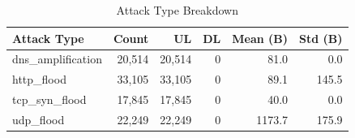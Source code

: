 \begin{table}[htbp]
\centering
\caption{Attack Type Breakdown}\label{tab:attack_types}
\begin{tabular}{lrrrrr}
\toprule
\textbf{Attack Type} & \textbf{Count} & \textbf{UL} & \textbf{DL} & \textbf{Mean (B)} & \textbf{Std (B)} \\
\midrule
dns\_amplification & 20,514 & 20,514 & 0 & 81.0 & 0.0 \\
http\_flood & 33,105 & 33,105 & 0 & 89.1 & 145.5 \\
tcp\_syn\_flood & 17,845 & 17,845 & 0 & 40.0 & 0.0 \\
udp\_flood & 22,249 & 22,249 & 0 & 1173.7 & 175.9 \\
\bottomrule
\end{tabular}
\end{table}
